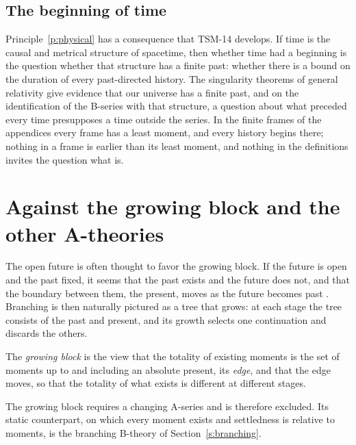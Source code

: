 \documentclass{situationist-preprint}
\begin{document}
\subsection{The beginning of time}

Principle~\ref{p:physical} has a consequence that TSM-14 develops. If time is the causal and metrical structure of spacetime, then whether time had a beginning is the question whether that structure has a finite past: whether there is a bound on the duration of every past-directed history. The singularity theorems of general relativity give evidence that our universe has a finite past, and on the identification of the B-series with that structure, a question about what preceded every time presupposes a time outside the series. In the finite frames of the appendices every frame has a least moment, and every history begins there; nothing in a frame is earlier than its least moment, and nothing in the definitions invites the question what is.

\section{Against the growing block and the other A-theories}\label{s:block}

The open future is often thought to favor the growing block. If the future is open and the past fixed, it seems that the past exists and the future does not, and that the boundary between them, the present, moves as the future becomes past \citep{Broad1923,Tooley1997,CorreiaRosenkranz2018}. Branching is then naturally pictured as a tree that grows: at each stage the tree consists of the past and present, and its growth selects one continuation and discards the others.

\begin{definition}\label{d:block}
The \emph{growing block} is the view that the totality of existing moments is the set of moments up to and including an absolute present, its \emph{edge}, and that the edge moves, so that the totality of what exists is different at different stages.
\end{definition}

\begin{theorem}\label{t:noblock}
The growing block requires a changing A-series and is therefore excluded. Its static counterpart, on which every moment exists and settledness is relative to moments, is the branching B-theory of Section~\ref{s:branching}.
\end{theorem}
\end{document}
